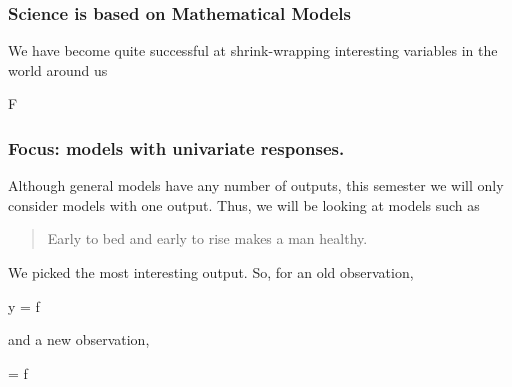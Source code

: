 \documentclass[handout]{beamer}
\begin{document}
\begin{frame}\frametitle{Science is based on Mathematical Models}

We have become quite successful at shrink-wrapping interesting variables in the world around us

\beqn
F
\eeqn
	
\end{frame}


\begin{frame}\frametitle{Focus: models with univariate responses.}

Although general models have any number of outputs, this semester we will only consider models with one output. Thus, we will be looking at models such as

\begin{quotation}
Early to bed and early to rise makes a man healthy.
\end{quotation}

We picked the most interesting output. So, for an old observation,

\beqn
y = f 
\eeqn

and a new observation,

\beqn
\yhat = f 
\eeqn
	
\end{frame}
\end{document}
